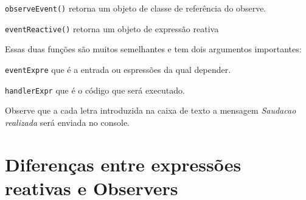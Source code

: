 \documentclass[
]{book}
\newenvironment{Shaded}{\begin{snugshade}}{\end{snugshade}}
\newcommand{\AttributeTok}[1]{\textcolor[rgb]{0.77,0.63,0.00}{#1}}
\newcommand{\ControlFlowTok}[1]{\textcolor[rgb]{0.13,0.29,0.53}{\textbf{#1}}}
\newcommand{\FunctionTok}[1]{\textcolor[rgb]{0.00,0.00,0.00}{#1}}
\newcommand{\NormalTok}[1]{#1}
\newcommand{\OtherTok}[1]{\textcolor[rgb]{0.56,0.35,0.01}{#1}}
\newcommand{\SpecialCharTok}[1]{\textcolor[rgb]{0.00,0.00,0.00}{#1}}
\newcommand{\StringTok}[1]{\textcolor[rgb]{0.31,0.60,0.02}{#1}}
\begin{document}
\texttt{observeEvent()} retorna um objeto de classe de referência do observe.

\texttt{eventReactive()} retorna um objeto de expressão reativa

Essas duas funções são muitos semelhantes e tem dois argumentos importantes:

\texttt{eventExpre} que é a entrada ou espressões da qual depender.

\texttt{handlerExpr} que é o código que será executado.

\begin{Shaded}
\end{Shaded}

Observe que a cada letra introduzida na caixa de texto a mensagem \emph{Saudacao realizada} será enviada no console.

\hypertarget{diferenuxe7as-entre-expressuxf5es-reativas-e-observers}{%
\section{\texorpdfstring{\textbf{Diferenças entre expressões reativas e Observers}}{Diferenças entre expressões reativas e Observers}}\label{diferenuxe7as-entre-expressuxf5es-reativas-e-observers}}
\end{document}
